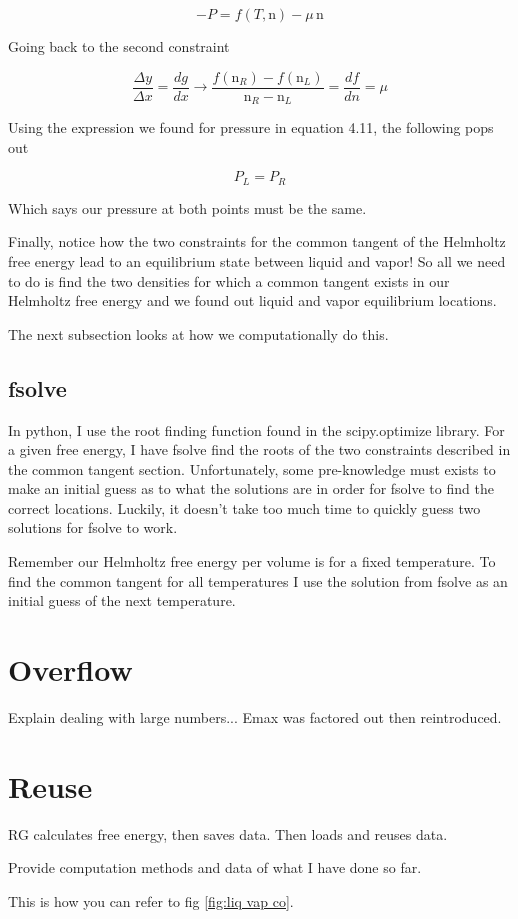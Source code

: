 \begin{equation}
-P = f(T,\text{n}) - \mu \, \text{n}
\end{equation}

Going back to the second constraint

\begin{equation}
\frac{\Delta y}{\Delta x} = \frac{dg}{dx} \rightarrow  \frac{f(\text{n}_R) - f(\text{n}_L)}{\text{n}_R-\text{n}_L} = \frac{df}{dn} = \mu
\end{equation}

Using the expression we found for pressure in equation 4.11, the following pops out

\begin{equation}
P_L = P_R
\end{equation}

Which says our pressure at both points must be the same.

Finally, notice how the two constraints for the common tangent of the Helmholtz free energy lead to an equilibrium state between liquid and vapor!  So all we need to do is find the two densities for which a common tangent exists in our Helmholtz free energy and we found out liquid and vapor equilibrium locations.

The next subsection looks at how we computationally do this.


\subsection{fsolve}

In python, I use the root finding function found in the scipy.optimize library.  For a given free energy, I have fsolve find the roots of the two constraints described in the common tangent section.  Unfortunately, some pre-knowledge must exists to make an initial guess as to what the solutions are in order for fsolve to find the correct locations.  Luckily, it doesn't take too much time to quickly guess two solutions for fsolve to work. 

Remember our Helmholtz free energy per volume is for a fixed temperature.  To find the common tangent for all temperatures I use the solution from fsolve as an initial guess of the next temperature.


\section{Overflow}
Explain dealing with large numbers... Emax was factored out then reintroduced.


\section{Reuse}
RG calculates free energy, then saves data.  Then loads and reuses data.

Provide computation methods and data of what I have done so far.

This is how you can refer to fig \ref{fig:liq vap co}. %




